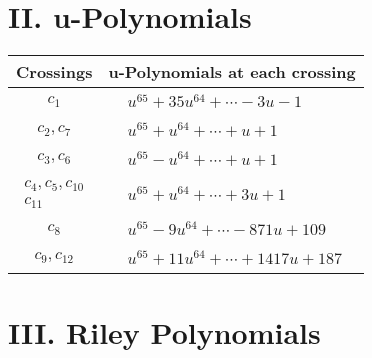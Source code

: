 \documentclass[1p]{elsarticle_modified}
\theoremstyle{definition}
\begin{document}
\newpage\renewcommand{\arraystretch}{1}
\centering \section*{ II. u-Polynomials}
\begin{tabular}{m{50pt}|m{274pt}}
Crossings & \hspace{64pt}u-Polynomials at each crossing \\
\hline $$\begin{aligned}c_{1}\end{aligned}$$&$\begin{aligned}
&u^{65}+35 u^{64}+\cdots-3 u-1
\end{aligned}$\\
\hline $$\begin{aligned}c_{2},c_{7}\end{aligned}$$&$\begin{aligned}
&u^{65}+u^{64}+\cdots+u+1
\end{aligned}$\\
\hline $$\begin{aligned}c_{3},c_{6}\end{aligned}$$&$\begin{aligned}
&u^{65}- u^{64}+\cdots+u+1
\end{aligned}$\\
\hline $$\begin{aligned}c_{4},c_{5},c_{10}\\c_{11}\end{aligned}$$&$\begin{aligned}
&u^{65}+u^{64}+\cdots+3 u+1
\end{aligned}$\\
\hline $$\begin{aligned}c_{8}\end{aligned}$$&$\begin{aligned}
&u^{65}-9 u^{64}+\cdots-871 u+109
\end{aligned}$\\
\hline $$\begin{aligned}c_{9},c_{12}\end{aligned}$$&$\begin{aligned}
&u^{65}+11 u^{64}+\cdots+1417 u+187
\end{aligned}$\\
\hline
\end{tabular}\newpage\renewcommand{\arraystretch}{1}
\centering \section*{ III. Riley Polynomials}
\end{document}
